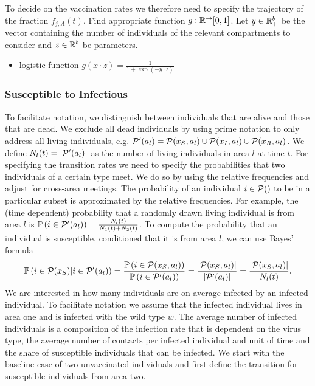 To decide on the vaccination rates we therefore need to specify the trajectory of the fraction $f_{j,A}(t)$. Find appropriate function $g: \mathbb{R}^ \to [0,1]$. Let $y \in \mathbb{R}^b_+$ be the vector containing the number of individuals of the relevant compartments to consider and $z \in \mathbb{R}^b$ be parameters.  
\begin{itemize}
	\item logistic function $g(x \cdot z) = \frac{1}{1 + \exp(-y \cdot z)}$

\end{itemize}

  
\subsubsection*{Susceptible to Infectious}
To facilitate notation, we distinguish between individuals that are alive and those that are dead. We exclude all dead individuals by using prime notation to only address all living individuals, e.g. $\mathcal{P}'(a_l) =  \mathcal{P}(x_S, a_l) \cup \mathcal{P}(x_I, a_l) \cup \mathcal{P}(x_R, a_l)$. We define $N_l(t) = |\mathcal{P}'(a_l) |$ as the number of living individuals in area $l$ at time $t$. For specifying the transition rates we need to specify the probabilities that two individuals of a certain type meet. We do so by using the relative frequencies and adjust for cross-area meetings. The probability of an individual $i \in \mathcal{P}()$ to be in a particular subset is approximated by the relative frequencies. For example, the (time dependent) probability that a randomly drawn living individual is from area $l$ is $\mathbb{P}\left(i \in \mathcal{P}'(a_l) \right) = \frac{N_l(t)}{N_1(t) + N_2(t)}$. To compute the probability that an individual is susceptible, conditioned that it is from area $l$, we can use Bayes' formula 
\begin{align}
\mathbb{P}\left( i \in \mathcal{P}(x_S) |  i \in \mathcal{P}'(a_l) \right)= \frac{\mathbb{P}\left(i \in  \mathcal{P}(x_S, a_l) \right)}{\mathbb{P}\left(i \in \mathcal{P}'(a_l)\right)} = \frac{|\mathcal{P}(x_S, a_l)|}{|\mathcal{P}'(a_l)|} = \frac{|\mathcal{P}(x_S, a_l)|}{N_l(t)}.
\end{align}
We are interested in how many individuals are on average infected by an infected individual. To facilitate notation we assume that the infected individual lives in area one and is infected with the wild type $w$. The average number of infected individuals is a composition of the infection rate that is dependent on the virus type, the average number of contacts per infected individual and unit of time and the share of susceptible individuals that can be infected. We start with the baseline case of two unvaccinated individuals and first define the transition for susceptible individuals from area two.\\ 
